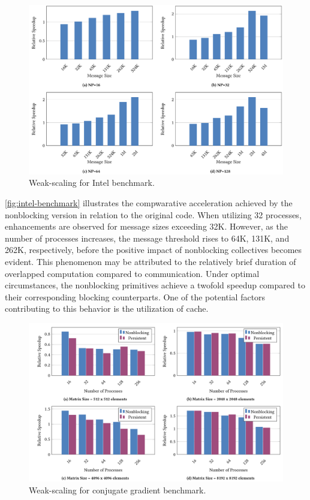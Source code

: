 \begin{figure}[!ht]
    \centering
    \includegraphics[width=\textwidth]{pictures/intel-benchmark.png}
    \caption{Weak-scaling for Intel benchmark. \cite{ahmed_transforming_2017}}
    \label{fig:intel-benchmark}
\end{figure}

\autoref{fig:intel-benchmark} illustrates the compwarative acceleration achieved by the nonblocking version in relation to the original code.
When utilizing 32 processes, enhancements are observed for message sizes exceeding 32K.
However, as the number of processes increases, the message threshold rises to 64K, 131K, and 262K, respectively, before the positive impact of nonblocking collectives becomes evident.
This phenomenon may be attributed to the relatively brief duration of overlapped computation compared to communication.
Under optimal circumstances, the nonblocking primitives achieve a twofold speedup compared to their corresponding blocking counterparts.
One of the potential factors contributing to this behavior is the utilization of cache.

\begin{figure}[!h]
    \centering
    \includegraphics[width=\textwidth]{pictures/conj-benchmark.png}
    \caption{Weak-scaling for conjugate gradient benchmark.}
    \label{fig:conj-benchmark}
\end{figure}

